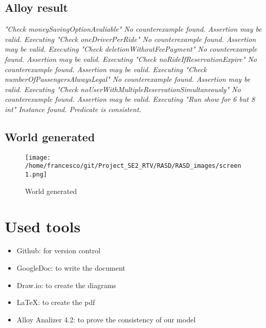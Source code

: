 \documentclass[10pt, a4paper,titlepage]{article}
\begin{document}
\subsection{Alloy result}
\textit{
"Check moneySavingOptionAvaliable"
No counterexample found. Assertion may be valid.
\newline
\newline
Executing "Check oneDriverPerRide"
No counterexample found. Assertion may be valid.
\newline
\newline
Executing "Check deletionWithoutFeePayment"
No counterexample found. Assertion may be valid.
\newline
\newline
Executing "Check noRideIfReservationExpire"
No counterexample found. Assertion may be valid.
\newline
\newline
Executing "Check numberOfPassengersAlwaysLegal"
No counterexample found. Assertion may be valid.
\newline
\newline
Executing "Check noUserWithMultipleReservationSimultaneously"
No counterexample found. Assertion may be valid.
\newline
\newline
Executing "Run show for 6 but 8 int"
Instance found. Predicate is consistent.
}
\clearpage
\subsection{World generated}
\begin{figure}[!b]
\texttt{[image: /home/francesco/git/Project\_SE2\_RTV/RASD/RASD\_images/screen1.png]}
\caption{World generated}
\label{fig:World generated}
\end{figure}
\clearpage
{}
\section*{Used tools}
\begin{itemize}
\item Github: for version control
\item GoogleDoc: to write the document
\item Draw.io: to create the diagrams
\item \LaTeX: to create the pdf
\item Alloy Analizer 4.2: to prove the consistency of our model 
\end{itemize}
\end{document}

